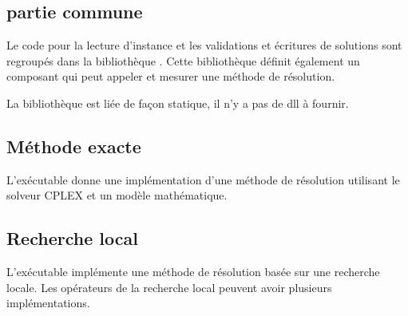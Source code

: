 \subsection{partie commune}
Le code pour la lecture d'instance et les validations et écritures de solutions sont regroupés  dans la bibliothèque .
Cette bibliothèque définit également un composant qui peut appeler et mesurer une méthode de résolution.

La bibliothèque est liée de façon statique, il n'y a pas de dll à fournir.
\subsection{Méthode exacte}

L'exécutable  donne une implémentation d'une méthode de résolution utilisant le solveur CPLEX et un modèle mathématique.

\subsection{Recherche local}

L'exécutable  implémente une méthode de résolution basée sur une recherche locale.
Les opérateurs de la recherche local peuvent avoir plusieurs implémentations.
